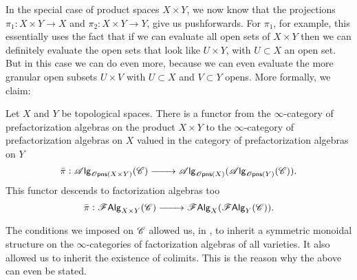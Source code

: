 \documentclass[../text]{subfiles}
\begin{document}
In the special case of product spaces $X \times Y$, we now know that the projections $\pi_1: X \times Y \rightarrow X$ and $\pi_2: X \times Y \rightarrow Y$, give us pushforwards. For $\pi_1$, for example, this essentially uses the fact that if we can evaluate all open sets of $X \times Y$ then we can definitely evaluate the open sets that look like $U \times Y$, with $U \subset X$ an open set. But in this case we can do even more, because we can even evaluate the more granular open subsets $U \times V$ with $U \subset X$ and $V \subset Y$ opens. More formally, we claim:
%
\begin{proposition}\label{prop:exp_of_products}
    Let $X$ and $Y$ be topological spaces. There is a functor from the $\infty$-category of prefactorization algebras on the product $X \times Y$ to the $\infty$-category of prefactorization algebras on $X$ valued in the category of prefactorization algebras on $Y$
    \begin{equation}
        \bar{\pi}: \alg{\opens(X \times Y)}(\catC) \xrightarrow{\qquad} \alg{\opens(X)} (\alg{\opens(Y)} (\catC)).
    \end{equation}
    This functor descends to factorization algebras too
    \begin{equation}
        \bar{\pi}: \mathscr{F} \mathsf{Alg}_{X \times Y}(\mathscr{C}) \xrightarrow{\qquad} \mathscr{F} \mathsf{Alg}_{X}(\mathscr{F} \mathsf{Alg}_{Y}(\mathscr{C})).
    \end{equation}
\end{proposition}

\begin{remark}
    The conditions we imposed on $\mathscr{C}$ allowed us, in , to inherit a symmetric monoidal structure on the $\infty$-categories of factorization algebras of all varieties. It also allowed us to inherit the existence of colimits. This is the reason why the above can even be stated.
\end{remark}
\end{document}
